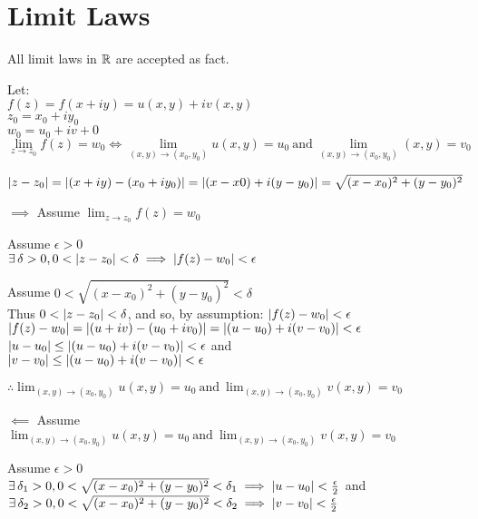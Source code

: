 \documentclass[letterpaper,12pt,fleqn]{article}
\renewcommand{\d}{\delta}
\newcommand{\e}{\epsilon}
\newcommand{\limz}{\lim_{z\to z_0}}
\newcommand{\limxy}{\lim_{(x,y)\to(x_0,y_0)}}
\begin{document}
\section*{Limit Laws}

All limit laws in $\mathbb{R}$ are accepted as fact.

\begin{theorem}
  Let: \\
  $f(z)=f(x+iy)=u(x,y)+iv(x,y)$ \\
  $z_0=x_0+iy_0$ \\
  $w_0=u_0+iv+0$ \\
  \[\limz{f(z)}=w_0\iff
  \limxy{u(x,y)}=u_0\ \mbox{and}\ \limxy{(x,y)}=v_0\]
\end{theorem}

\begin{theproof}
  $\lvert z-z_0\rvert=\lvert(x+iy)-(x_0+iy_0)\rvert=\lvert(x-x0)+i(y-y_0)\rvert=
  \sqrt{(x-x_0)^2+(y-y_0)^2}$
  \begin{description}
  \item $\implies$ Assume $\limz{f(z)}=w_0$

    Assume $\e>0$ \\
    $\exists\,\d>0,0<\abs{z-z_0}<\d\implies\abs{f(z)-w_0}<\e$

    Assume $0<\sqrt{(x-x_0)^2+(y-y_0)^2}<\d$ \\
    Thus $0<\abs{z-z_0}<\d$, and so, by assumption: $\abs{f(z)-w_0}<\e$ \\
    $\abs{f(z)-w_0}=\abs{(u+iv)-(u_0+iv_0)}=\abs{(u-u_0)+i(v-v_0)}<\e$ \\
    $\abs{u-u_0}\le\abs{(u-u_0)+i(v-v_0)}<\e$ and \\
    $\abs{v-v_0}\le\abs{(u-u_0)+i(v-v_0)}<\e$

    $\therefore \limxy{u(x,y)}=u_0\ \mbox{and}\ \limxy{v(x,y)}=v_0$

  \item $\impliedby$ Assume $\limxy{u(x,y)}=u_0\ \mbox{and}\ \limxy{v(x,y)}=v_0$

    Assume $\e>0$ \\
    $\exists\,\d_1>0,0<\sqrt{(x-x_0)^2+(y-y_0)^2}<\d_1\implies
    \abs{u-u_0}<\frac{\e}{2}$ and \\
    $\exists\,\d_2>0,0<\sqrt{(x-x_0)^2+(y-y_0)^2}<\d_2\implies
    \abs{v-v_0}<\frac{\e}{2}$ \\


\end{description}
\end{theproof}
\end{document}
